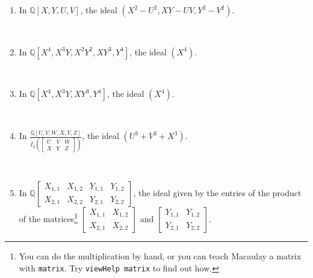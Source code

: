 \documentclass[12pt]{amsart}
\newcommand{\Q}{\mathbb{Q}}
\begin{document}
\begin{enumerate}
\begin{enumerate}
\item In $\Q[X,Y,U,V]$, the ideal $(X^2-U^2,XY-UV,Y^2-V^2)$.

\

\item In $\Q[X^4,X^3Y,X^2Y^2,XY^3,Y^4]$, the ideal $(X^4)$.

\

\item In $\Q[X^4,X^3Y,XY^3,Y^4]$, the ideal $(X^4)$.

\

\item In $\displaystyle \frac{\Q[U,V,W,X,Y,Z]}{I_2 \left( \left[  \begin{matrix} U & V & W \\ X&Y&Z \end{matrix}\right]\right)}$, the ideal $(U^3+V^3+X^3)$.

\

\medskip

\item In $\Q\left[ \begin{matrix} X_{1,1} & X_{1,2} & Y_{1,1} & Y_{1,2} \\ X_{2,1} & X_{2,2} & Y_{2,1} & Y_{2,2} \end{matrix}\right]$, the ideal given by the entries of the product of the matrices\footnote{You can do the multiplication by hand, or you can teach Macaulay a matrix with \texttt{matrix}. Try \texttt{viewHelp matrix} to find out how.} $\begin{bmatrix} X_{1,1} & X_{1,2}  \\  X_{2,1} & X_{2,2}\end{bmatrix}$ and $\begin{bmatrix} Y_{1,1} & Y_{1,2}  \\  Y_{2,1} & Y_{2,2}\end{bmatrix}$.

\end{enumerate}








\end{enumerate}
\end{document}
